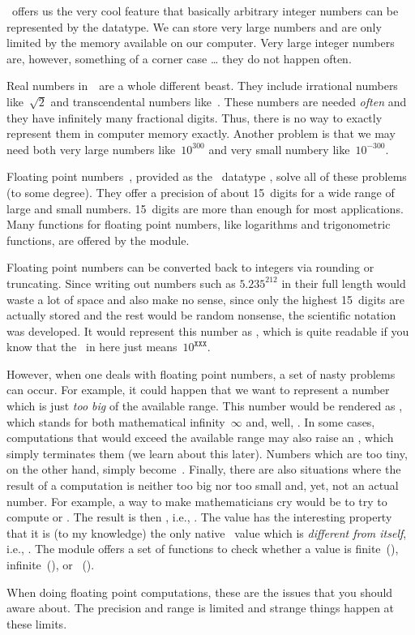 \python\ offers us the very cool feature that basically arbitrary integer numbers can be represented by the  datatype.
We can store very large numbers and are only limited by the memory available on our computer.
Very large integer numbers are, however, something of a corner case {\dots} they do not happen often.

Real numbers in~\realNumbers\ are a whole different beast.
They include irrational numbers like~$\sqrt{2}$ and transcendental numbers like~\numberPi.
These numbers are needed \emph{often} and they have infinitely many fractional digits.
Thus, there is no way to exactly represent them in computer memory exactly.
Another problem is that we may need both very large numbers like~$10^{300}$ and very small numbery like~$10^{-300}$.

Floating point numbers~\cite{G2023CAIP}, provided as the \python\ datatype , solve all of these problems (to some degree).
They offer a precision of about 15~digits for a wide range of large and small numbers.
15~digits are more than enough for most applications.
Many functions for floating point numbers, like logarithms and trigonometric functions, are offered by the  module.

Floating point numbers can be converted back to integers via rounding or truncating.
Since writing out numbers such as $5.235^{212}$ in their full length would waste a lot of space and also make no sense, since only the highest 15~digits are actually stored and the rest would be random nonsense, the scientific notation was developed.
It would represent this number as , which is quite readable if you know that the~ in  here just means~$10^{\mathtt{XXX}}$.

However, when one deals with floating point numbers, a set of nasty problems can occur.
For example, it could happen that we want to represent a number which is just \emph{too big} of the available range.
This number would be rendered as , which stands for both mathematical infinity~$\infty$ and, well, .
In some cases, computations that would exceed the available range may also raise an , which simply terminates them (we learn about this later).
Numbers which are too tiny, on the other hand, simply become~.
Finally, there are also situations where the result of a computation is neither too big nor too small and, yet, not an actual number.
For example, a way to make mathematicians cry would be to try to compute  or .
The result is then , i.e., .
The value  has the interesting property that it is (to my knowledge) the only native \python\ value which is \emph{different from itself}, i.e., .
The  module offers a set of functions to check whether a value is finite~(), infinite~(), or ~().

When doing floating point computations, these are the issues that you should aware about.
The precision and range is limited and strange things happen at these limits.%
%
\endhsection%
%
\FloatBarrier%
\endhsection%
%

